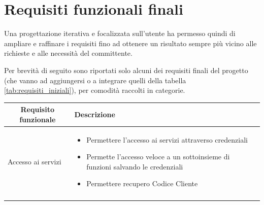 \section{Requisiti funzionali finali}

Una progettazione iterativa e focalizzata sull'utente ha permesso quindi di ampliare e raffinare i requisiti fino ad ottenere  un risultato sempre più vicino alle richieste e alle necessità del committente.  

Per brevità di seguito sono riportati solo alcuni dei requisiti finali del progetto (che vanno ad aggiungersi o a integrare quelli della tabella \ref{tab:requisiti_iniziali}), per comodità raccolti in categorie.

\begin{center}

    \begin{longtable}{p{6cm}|p{8cm}}

    \toprule
    \multicolumn{1}{c}{\textbf{Requisito funzionale}} &
    \textbf{Descrizione}\\

    \midrule
    Accesso ai servizi & \begin{itemize}
                          \item Permettere l'accesso ai servizi attraverso credenziali
                          \item Permette l'accesso veloce a un sottoinsieme di funzioni salvando le credenziali
                          \item Permettere recupero Codice Cliente
                         \end{itemize}\\\\


\end{longtable}
\end{center}

